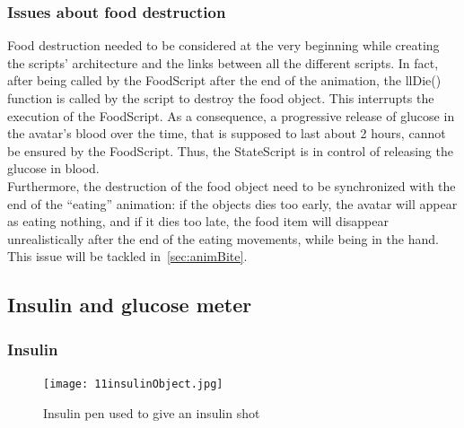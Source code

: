 \fi

    \subsubsection{Issues about food destruction}
\label{foodDestruction}
Food destruction needed to be considered at the very beginning while creating the scripts' architecture and the links between all the different scripts. In fact, after being called by the FoodScript after the end of the animation, the llDie()~\cite{LSLWebsite} function is called by the script to destroy the food object. This interrupts the execution of the FoodScript. As a consequence, a progressive release of glucose in the avatar's blood over the time, that is supposed to last about 2 hours, cannot be ensured by the FoodScript. Thus, the StateScript is in control of releasing the glucose in blood.\\

Furthermore, the destruction of the food object need to be synchronized with the end of the ``eating'' animation: if the objects dies too early, the avatar will appear as eating nothing, and if it dies too late, the food item will disappear unrealistically after the end of the eating movements, while being in the hand. This issue will be tackled in~\ref{sec:animBite}.






\subsection{Insulin and glucose meter}
	\subsubsection{Insulin} 

\begin{figure}[h]
  \caption{Insulin pen used to give an insulin shot}
  \centering
  \texttt{[image: 11insulinObject.jpg]}
  \label{fig:11insulinObject}
\end{figure}

